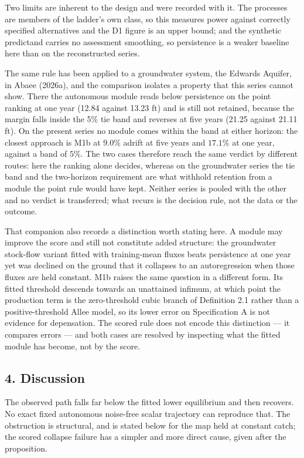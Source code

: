 \documentclass[11pt]{article}
\begin{document}
Two limits are inherent to the design and were recorded with it. The
processes are members of the ladder's own class, so this measures power
against correctly specified alternatives and the D1 figure is an upper
bound; and the synthetic predictand carries no assessment smoothing, so
persistence is a weaker baseline here than on the reconstructed series.

The same rule has been applied to a groundwater system, the Edwards
Aquifer, in Abaee (2026a), and the comparison isolates a property that
this series cannot show. There the autonomous module reads below
persistence on the point ranking at one year (12.84 against 13.23 ft)
and is still not retained, because the margin falls inside the 5\% tie
band and reverses at five years (21.25 against 21.11 ft). On the present
series no module comes within the band at either horizon: the closest
approach is M1b at \(9.0\%\) adrift at five years and \(17.1\%\) at one
year, against a band of \(5\%\). The two cases therefore reach the same verdict by
different routes: here the ranking alone decides, whereas on the
groundwater series the tie band and the two-horizon requirement are what
withhold retention from a module the point rule would have kept. Neither
series is pooled with the other and no verdict is transferred; what
recurs is the decision rule, not the data or the outcome.

That companion also records a distinction worth stating here. A module
may improve the score and still not constitute added structure: the
groundwater stock-flow variant fitted with training-mean fluxes beats
persistence at one year yet was declined on the ground that it collapses
to an autoregression when those fluxes are held constant. M1b raises the
same question in a different form. Its fitted threshold descends towards
an unattained infimum, at which point the production term is the
zero-threshold cubic branch of Definition 2.1 rather than a
positive-threshold Allee model, so its lower error on Specification A is
not evidence for depensation. The scored rule does not encode this
distinction --- it compares errors --- and both cases are resolved by
inspecting what the fitted module has become, not by the score.

\subsection{4. Discussion}\label{discussion}

The observed path falls far below the fitted lower equilibrium and then
recovers. No exact fixed autonomous noise-free scalar trajectory can
reproduce that. The obstruction is structural, and is stated below for
the map held at constant catch; the scored collapse failure has a
simpler and more direct cause, given after the proposition.
\end{document}
